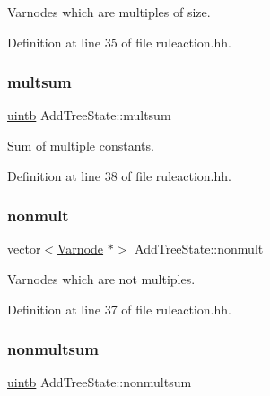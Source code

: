 Varnodes which are multiples of size. 



Definition at line 35 of file ruleaction.\+hh.

\mbox{\label{class_add_tree_state_acbfd064f5fab88778d1a82d6e1bf210c}} 
\subsubsection{\texorpdfstring{multsum}{multsum}}
{\footnotesize\ttfamily \mbox{\hyperlink{types_8h_a2db313c5d32a12b01d26ac9b3bca178f}{uintb}} Add\+Tree\+State\+::multsum}



Sum of multiple constants. 



Definition at line 38 of file ruleaction.\+hh.

\mbox{\label{class_add_tree_state_ac11cb69f9f85a57c23ddd3fe369bfbff}} 
\subsubsection{\texorpdfstring{nonmult}{nonmult}}
{\footnotesize\ttfamily vector$<$\mbox{\hyperlink{class_varnode}{Varnode}} $\ast$$>$ Add\+Tree\+State\+::nonmult}



Varnodes which are not multiples. 



Definition at line 37 of file ruleaction.\+hh.

\mbox{\label{class_add_tree_state_a0673da5a1c73b83c06a96730b3676778}} 
\subsubsection{\texorpdfstring{nonmultsum}{nonmultsum}}
{\footnotesize\ttfamily \mbox{\hyperlink{types_8h_a2db313c5d32a12b01d26ac9b3bca178f}{uintb}} Add\+Tree\+State\+::nonmultsum}



